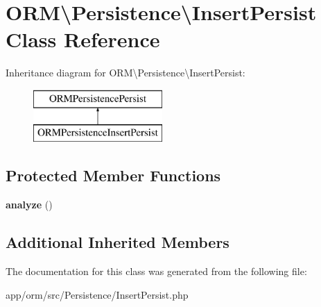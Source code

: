 \hypertarget{classORM_1_1Persistence_1_1InsertPersist}{}\section{O\+RM\textbackslash{}Persistence\textbackslash{}Insert\+Persist Class Reference}
\label{classORM_1_1Persistence_1_1InsertPersist}
Inheritance diagram for O\+RM\textbackslash{}Persistence\textbackslash{}Insert\+Persist\+:\begin{figure}[H]
\begin{center}
\leavevmode
\includegraphics[height=2.000000cm]{classORM_1_1Persistence_1_1InsertPersist}
\end{center}
\end{figure}
\subsection*{Protected Member Functions}
\begin{DoxyCompactItemize}
\item 
{\bfseries analyze} ()\hypertarget{classORM_1_1Persistence_1_1InsertPersist_a6a9673546ee81a4d6998c501a030b359}{}\label{classORM_1_1Persistence_1_1InsertPersist_a6a9673546ee81a4d6998c501a030b359}

\end{DoxyCompactItemize}
\subsection*{Additional Inherited Members}


The documentation for this class was generated from the following file\+:\begin{DoxyCompactItemize}
\item 
app/orm/src/\+Persistence/Insert\+Persist.\+php\end{DoxyCompactItemize}
